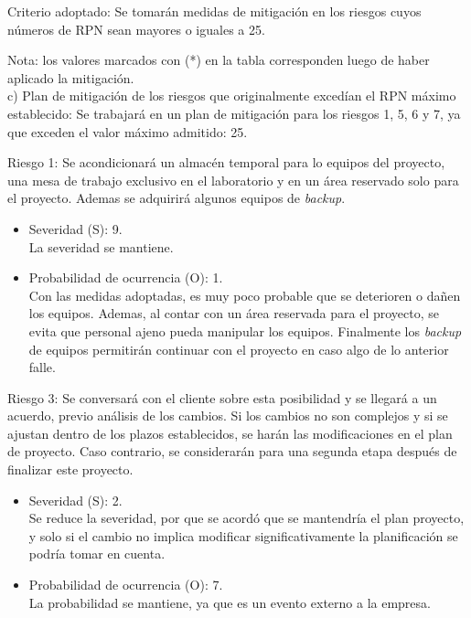 \documentclass[
11pt, %
]{charter}
\begin{document}
Criterio adoptado: 
Se tomarán medidas de mitigación en los riesgos cuyos números de RPN sean mayores o iguales a 25.

Nota: los valores marcados con (*) en la tabla corresponden luego de haber aplicado la mitigación.\\


c) Plan de mitigación de los riesgos que originalmente excedían el RPN máximo establecido:
Se trabajará en un plan de mitigación para los riesgos 1, 5, 6 y 7, ya que exceden el valor máximo admitido: 25.

Riesgo 1: Se acondicionará un almacén temporal para lo equipos del proyecto, una mesa de trabajo exclusivo en el laboratorio y  en un área reservado solo para el proyecto. Ademas se adquirirá  algunos equipos de \textit{backup}.
\begin{itemize}
  \item Severidad (S): 9. \\
  La severidad se mantiene.
  \item Probabilidad de ocurrencia (O): 1.\\
  Con las medidas adoptadas, es muy poco probable que se deterioren o dañen los equipos. Ademas, al contar con un área reservada para el proyecto, se evita que personal ajeno pueda manipular los equipos. Finalmente los \textit{backup} de equipos permitirán continuar con el proyecto en caso algo de lo anterior falle.
\end{itemize}

Riesgo 3: Se conversará con el cliente sobre esta posibilidad y se llegará a un acuerdo, previo análisis de los cambios. Si los cambios no son complejos y si se ajustan dentro de los plazos establecidos, se harán las modificaciones en el plan de proyecto. Caso contrario, se considerarán para una segunda etapa después de finalizar este proyecto.
\begin{itemize}
  \item Severidad (S): 2. \\
  Se reduce la severidad, por que se acordó que se mantendría el plan proyecto, y solo si el cambio no implica modificar significativamente la planificación se podría tomar en cuenta.
  \item Probabilidad de ocurrencia (O): 7.\\
  La probabilidad se mantiene, ya que es un evento externo a la empresa.
\end{itemize}
\end{document}
